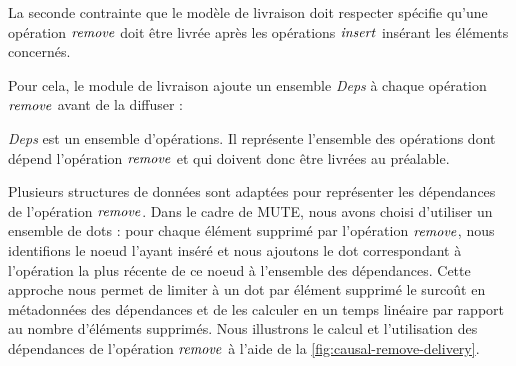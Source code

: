 La seconde contrainte que le modèle de livraison doit respecter spécifie qu'une opération $\mathit{remove}$ doit être livrée après les opérations $\mathit{insert}$ insérant les éléments concernés.

Pour cela, le module de livraison ajoute un ensemble \emph{Deps} à chaque opération $\mathit{remove}$ avant de la diffuser :

\begin{definition}[Deps]
  \emph{Deps} est un ensemble d'opérations.
  Il représente l'ensemble des opérations dont dépend l'opération $\mathit{remove}$ et qui doivent donc être livrées au préalable.
\end{definition}

Plusieurs structures de données sont adaptées pour représenter les dépendances de l'opération $\mathit{remove}$.
Dans le cadre de MUTE, nous avons choisi d'utiliser un ensemble de dots : pour chaque élément supprimé par l'opération $\mathit{remove}$, nous identifions le noeud l'ayant inséré et nous ajoutons le dot correspondant à l'opération la plus récente de ce noeud à l'ensemble des dépendances.
Cette approche nous permet de limiter à un dot par élément supprimé le surcoût en métadonnées des dépendances et de les calculer en un temps linéaire par rapport au nombre d'éléments supprimés.
Nous illustrons le calcul et l'utilisation des dépendances de l'opération $\mathit{remove}$ à l'aide de la \autoref{fig:causal-remove-delivery}.\\

